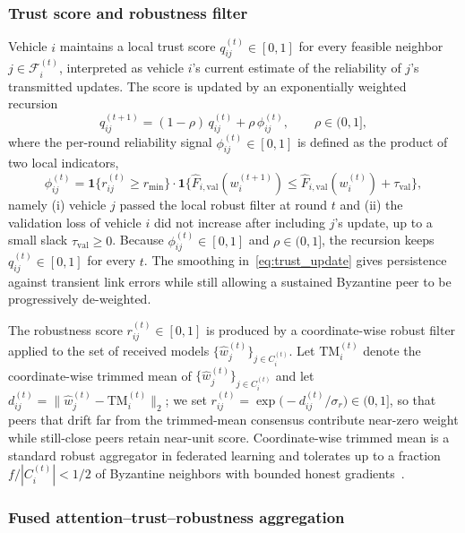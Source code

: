 \subsubsection{Trust score and robustness filter}
\label{subsubsec:trust}

Vehicle $i$ maintains a local trust score $q_{ij}^{(t)}\in[0,1]$ for every feasible neighbor $j\in\mathcal{F}_i^{(t)}$, interpreted as vehicle $i$'s current estimate of the reliability of $j$'s transmitted updates. The score is updated by an exponentially weighted recursion
\begin{equation}
\label{eq:trust_update}
    q_{ij}^{(t+1)} = (1-\rho)\,q_{ij}^{(t)} + \rho\,\phi_{ij}^{(t)},\qquad \rho\in(0,1],
\end{equation}
where the per-round reliability signal $\phi_{ij}^{(t)}\in[0,1]$ is defined as the product of two local indicators,
\begin{equation*}
    \phi_{ij}^{(t)} = \mathbf{1}\!\bigl\{r_{ij}^{(t)}\ge r_{\min}\bigr\}\cdot\mathbf{1}\!\bigl\{\widehat F_{i,\mathrm{val}}(w_i^{(t+1)})\le \widehat F_{i,\mathrm{val}}(w_i^{(t)})+\tau_{\mathrm{val}}\bigr\},
\end{equation*}
namely (i) vehicle $j$ passed the local robust filter at round $t$ and (ii) the validation loss of vehicle $i$ did not increase after including $j$'s update, up to a small slack $\tau_{\mathrm{val}}\ge 0$. Because $\phi_{ij}^{(t)}\in[0,1]$ and $\rho\in(0,1]$, the recursion keeps $q_{ij}^{(t)}\in[0,1]$ for every $t$. The smoothing in~\eqref{eq:trust_update} gives persistence against transient link errors while still allowing a sustained Byzantine peer to be progressively de-weighted.

The robustness score $r_{ij}^{(t)}\in[0,1]$ is produced by a coordinate-wise robust filter applied to the set of received models $\{\hat w_j^{(t)}\}_{j\in C_i^{(t)}}$. Let $\mathrm{TM}_i^{(t)}$ denote the coordinate-wise trimmed mean of $\{\hat w_j^{(t)}\}_{j\in C_i^{(t)}}$ and let $d_{ij}^{(t)}=\|\hat w_j^{(t)}-\mathrm{TM}_i^{(t)}\|_2$; we set $r_{ij}^{(t)}=\exp\!\bigl(-d_{ij}^{(t)}/\sigma_r\bigr)\in(0,1]$, so that peers that drift far from the trimmed-mean consensus contribute near-zero weight while still-close peers retain near-unit score. Coordinate-wise trimmed mean is a standard robust aggregator in federated learning and tolerates up to a fraction $f/|C_i^{(t)}|<1/2$ of Byzantine neighbors with bounded honest gradients~\cite{yin2018byzantine,karimireddy2021learning}.

\subsubsection{Fused attention--trust--robustness aggregation}
\label{subsubsec:agg}

